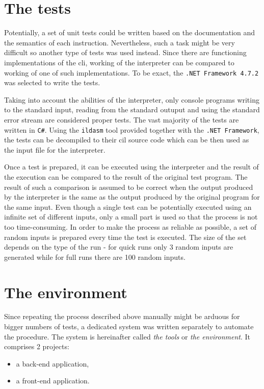 \documentclass[declaration,shortabstract,english,mgr]{iithesis}
\begin{document}
\section{The tests}

Potentially, a set of unit tests could be written based on the documentation and the semantics of each instruction. Nevertheless, such a task might be very difficult so another type of tests was used instead. Since there are functioning implementations of the \acrshort{cli}, working of the interpreter can be compared to working of one of such implementations. To be exact, the \texttt{.NET Framework 4.7.2} was selected to write the tests.

Taking into account the abilities of the interpreter, only console programs writing to the standard input, reading from the standard outuput and using the standard error stream are considered proper tests. The vast majority of the tests are written in \texttt{C\#}. Using the \texttt{ildasm} tool provided together with the \texttt{.NET Framework}, the tests can be decompiled to their \acrshort{cil} source code which can be then used as the input file for the interpreter. 

Once a test is prepared, it can be executed using the interpreter and the result of the execution can be compared to the result of the original test program. The result of such a comparison is assumed to be correct when the output produced by the interpreter is the same as the output produced by the original program for the same input. Even though a single test can be potentially executed using an infinite set of different inputs, only a small part is used so that the process is not too time-consuming. In order to make the process as reliable as possible, a set of random inputs is prepared every time the test is executed. The size of the set depends on the type of the run - for quick runs only 3 random inputs are generated while for full runs there are 100 random inputs.

\section{The environment}
\label{sec:environment}

Since repeating the process described above manually might be arduous for bigger numbers of tests, a dedicated system was written separately to automate the procedure. The system is hereinafter called \textit{the tools} or \textit{the environment}. It comprises 2 projects:
\begin{itemize}
	\item{a back-end application,}
	\item{a front-end application.}
\end{itemize}
\end{document}
